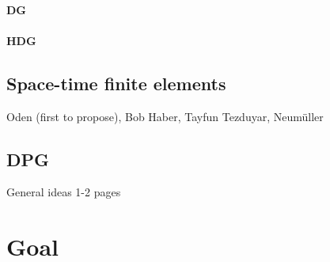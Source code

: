 \documentclass[Proposal.tex]{subfiles}
\begin{document}
\paragraph{DG}
\paragraph{HDG}

\subsection{Space-time finite elements}
Oden (first to propose), Bob Haber, Tayfun Tezduyar, Neum\"{u}ller
\cite{Klaij2006}
\cite{Rhebergen2013}

\subsection{DPG}
General ideas 1-2 pages


\section{Goal}
\end{document}
